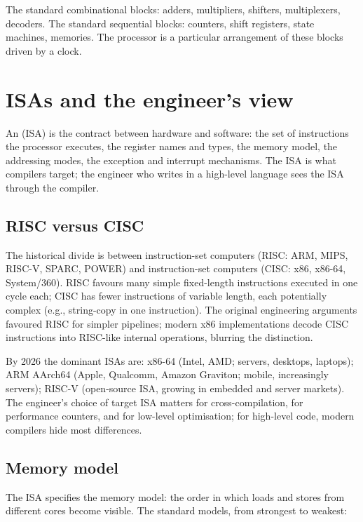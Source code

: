 The standard combinational blocks: adders, multipliers, shifters, multiplexers, decoders. The standard sequential blocks: counters, shift registers, state machines, memories. The processor is a particular arrangement of these blocks driven by a clock.

\section{ISAs and the engineer's view}

An  (ISA) is the contract between hardware and software: the set of instructions the processor executes, the register names and types, the memory model, the addressing modes, the exception and interrupt mechanisms. The ISA is what compilers target; the engineer who writes in a high-level language sees the ISA through the compiler.

\subsection{RISC versus CISC}

The historical divide is between  instruction-set computers (RISC: ARM, MIPS, RISC-V, SPARC, POWER) and  instruction-set computers (CISC: x86, x86-64, System/360). RISC favours many simple fixed-length instructions executed in one cycle each; CISC has fewer instructions of variable length, each potentially complex (e.g., string-copy in one instruction). The original engineering arguments favoured RISC for simpler pipelines; modern x86 implementations decode CISC instructions into RISC-like internal operations, blurring the distinction.

By 2026 the dominant ISAs are: x86-64 (Intel, AMD; servers, desktops, laptops); ARM AArch64 (Apple, Qualcomm, Amazon Graviton; mobile, increasingly servers); RISC-V (open-source ISA, growing in embedded and server markets). The engineer's choice of target ISA matters for cross-compilation, for performance counters, and for low-level optimisation; for high-level code, modern compilers hide most differences.

\subsection{Memory model}

The ISA specifies the memory model: the order in which loads and stores from different cores become visible. The standard models, from strongest to weakest:

